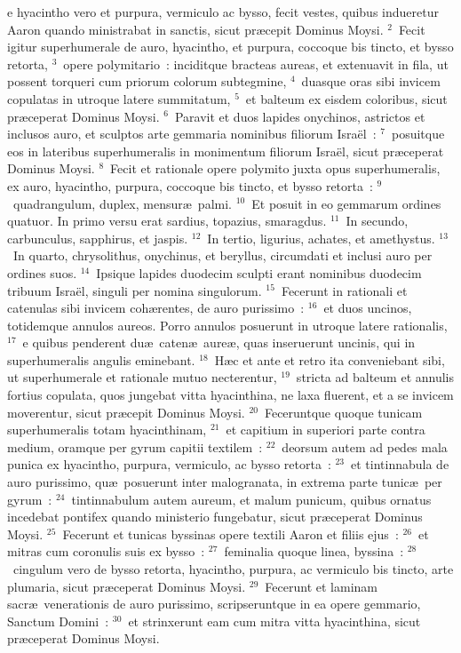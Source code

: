 \bchapter
{}e hyacintho vero et purpura, vermiculo ac bysso, fecit vestes, quibus indueretur Aaron quando ministrabat in sanctis, sicut pr\ae cepit Dominus Moysi.
${}^{2}$~Fecit igitur superhumerale de auro, hyacintho, et purpura, coccoque bis tincto, et bysso retorta,
${}^{3}$~opere polymitario~: inciditque bracteas aureas, et extenuavit in fila, ut possent torqueri cum priorum colorum subtegmine,
${}^{4}$~duasque oras sibi invicem copulatas in utroque latere summitatum,
${}^{5}$~et balteum ex eisdem coloribus, sicut pr\ae ceperat Dominus Moysi.
${}^{6}$~Paravit et duos lapides onychinos, astrictos et inclusos auro, et sculptos arte gemmaria nominibus filiorum Isra\"el~:
${}^{7}$~posuitque eos in lateribus superhumeralis in monimentum filiorum Isra\"el, sicut pr\ae ceperat Dominus Moysi.
${}^{8}$~Fecit et rationale opere polymito juxta opus superhumeralis, ex auro, hyacintho, purpura, coccoque bis tincto, et bysso retorta~:
${}^{9}$~quadrangulum, duplex, mensur\ae\ palmi.
${}^{10}$~Et posuit in eo gemmarum ordines quatuor. In primo versu erat sardius, topazius, smaragdus.
${}^{11}$~In secundo, carbunculus, sapphirus, et jaspis.
${}^{12}$~In tertio, ligurius, achates, et amethystus.
${}^{13}$~In quarto, chrysolithus, onychinus, et beryllus, circumdati et inclusi auro per ordines suos.
${}^{14}$~Ipsique lapides duodecim sculpti erant nominibus duodecim tribuum Isra\"el, singuli per nomina singulorum.
${}^{15}$~Fecerunt in rationali et catenulas sibi invicem coh\ae rentes, de auro purissimo~:
${}^{16}$~et duos uncinos, totidemque annulos aureos. Porro annulos posuerunt in utroque latere rationalis,
${}^{17}$~e quibus penderent du\ae\ caten\ae\ aure\ae , quas inseruerunt uncinis, qui in superhumeralis angulis eminebant.
${}^{18}$~H\ae c et ante et retro ita conveniebant sibi, ut superhumerale et rationale mutuo necterentur,
${}^{19}$~stricta ad balteum et annulis fortius copulata, quos jungebat vitta hyacinthina, ne laxa fluerent, et a se invicem moverentur, sicut pr\ae cepit Dominus Moysi.
${}^{20}$~Feceruntque quoque tunicam superhumeralis totam hyacinthinam,
${}^{21}$~et capitium in superiori parte contra medium, oramque per gyrum capitii textilem~:
${}^{22}$~deorsum autem ad pedes mala punica ex hyacintho, purpura, vermiculo, ac bysso retorta~:
${}^{23}$~et tintinnabula de auro purissimo, qu\ae\ posuerunt inter malogranata, in extrema parte tunic\ae\ per gyrum~:
${}^{24}$~tintinnabulum autem aureum, et malum punicum, quibus ornatus incedebat pontifex quando ministerio fungebatur, sicut pr\ae ceperat Dominus Moysi.
${}^{25}$~Fecerunt et tunicas byssinas opere textili Aaron et filiis ejus~:
${}^{26}$~et mitras cum coronulis suis ex bysso~:
${}^{27}$~feminalia quoque linea, byssina~:
${}^{28}$~cingulum vero de bysso retorta, hyacintho, purpura, ac vermiculo bis tincto, arte plumaria, sicut pr\ae ceperat Dominus Moysi.
${}^{29}$~Fecerunt et laminam sacr\ae\ venerationis de auro purissimo, scripseruntque in ea opere gemmario, Sanctum Domini~:
${}^{30}$~et strinxerunt eam cum mitra vitta hyacinthina, sicut pr\ae ceperat Dominus Moysi.


